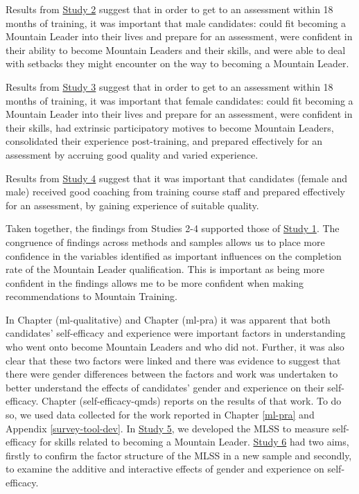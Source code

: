 \documentclass[
  12pt,
  a4paper,
]{book}
\begin{document}
Results from \protect\hyperlink{male-gta}{Study 2} suggest that in order to get to an assessment within 18 months of training, it was important that male candidates: could fit becoming a Mountain Leader into their lives and prepare for an assessment, were confident in their ability to become Mountain Leaders and their skills, and were able to deal with setbacks they might encounter on the way to becoming a Mountain Leader.

Results from \protect\hyperlink{female-gta}{Study 3} suggest that in order to get to an assessment within 18 months of training, it was important that female candidates: could fit becoming a Mountain Leader into their lives and prepare for an assessment, were confident in their skills, had extrinsic participatory motives to become Mountain Leaders, consolidated their experience post-training, and prepared effectively for an assessment by accruing good quality and varied experience.

Results from \protect\hyperlink{ftp}{Study 4} suggest that it was important that candidates (female and male) received good coaching from training course staff and prepared effectively for an assessment, by gaining experience of suitable quality.

Taken together, the findings from Studies 2-4 supported those of \protect\hyperlink{ml-qualitative}{Study 1}. The congruence of findings across methods and samples allows us to place more confidence in the variables identified as important influences on the completion rate of the Mountain Leader qualification. This is important as being more confident in the findings allows me to be more confident when making recommendations to Mountain Training.

In Chapter \citet{ref}(ml-qualitative) and Chapter \citet{ref}(ml-pra) it was apparent that both candidates' self-efficacy and experience were important factors in understanding who went onto become Mountain Leaders and who did not. Further, it was also clear that these two factors were linked and there was evidence to suggest that there were gender differences between the factors and work was undertaken to better understand the effects of candidates' gender and experience on their self-efficacy. Chapter \citet{ref}(self-efficacy-qmds) reports on the results of that work. To do so, we used data collected for the work reported in Chapter \ref{ml-pra} and Appendix \ref{survey-tool-dev}. In \href{study-5}{Study 5}, we developed the MLSS to measure self-efficacy for skills related to becoming a Mountain Leader. \href{study-6}{Study 6} had two aims, firstly to confirm the factor structure of the MLSS in a new sample and secondly, to examine the additive and interactive effects of gender and experience on self-efficacy.
\end{document}
